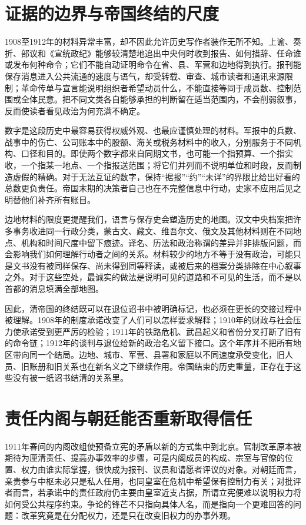 \section{证据的边界与帝国终结的尺度}

1908至1912年的材料异常丰富，却不因此允许历史写作者装作无所不知。上谕、奏折、部议和《宣统政纪》能够较清楚地追出中央何时收到报告、如何措辞、任命谁或发布何种命令；它们不能自动证明命令在省、县、军营和边地得到执行。报刊能保存消息进入公共流通的速度与语气，却受转载、审查、城市读者和通讯来源限制；革命传单与宣言能说明组织者希望动员什么，不能直接等同于成员数、控制范围或全体民意。把不同文类各自能够承担的判断留在适当范围内，不会削弱叙事，反而使读者看见政治为何充满不确定。

数字是这段历史中最容易获得权威外观、也最应谨慎处理的材料。军报中的兵数、战事中的伤亡、公司账本中的股额、海关或税务材料中的收入，分别服务于不同机构、口径和目的。即使两个数字都来自同期文书，也可能一个指预算、一个指实收，一个指某一地点、一个指报送范围；将它们并列而不说明单位和时段，反而制造虚假的精确。对于无法互证的数字，保持“据报”“约”“未详”的界限比给出好看的总数更负责任。帝国末期的决策者自己也在不完整信息中行动，史家不应用后见之明替他们补齐所有账目。

边地材料的限度更提醒我们，语言与保存史会塑造历史的地图。汉文中央档案把许多事务收进同一行政分类，蒙古文、藏文、维吾尔文、俄文及其他材料则在不同地点、机构和时间尺度中留下痕迹。译名、历法和政治称谓的差异并非排版问题，而会影响我们如何理解行动者之间的关系。材料较少的地方不等于没有政治，可能只是文书没有被同样保存、尚未得到同等释读，或被后来的档案分类排除在中心叙事之外。对于这些空处，最诚实的做法是说明可见的道路和不可见的生活，而不是以首都的消息填满全部地图。

因此，清帝国的终结既可以在退位诏书中被明确标记，也必须在更长的交接过程中被理解。1908年的制度承诺改变了人们可以怎样要求解释；1910年的财政与社会压力使承诺受到更严厉的检验；1911年的铁路危机、武昌起义和省份分叉打断了旧有的命令链；1912年的谈判与退位给新的政治名义留下接口。这个年序并不把所有地区带向同一个结局。边地、城市、军营、县署和家庭以不同速度承受变化，旧人员、旧账册和旧关系也在新名义之下继续作用。帝国结束的历史重量，正存在于这些没有被一纸诏书结清的关系里。

\section{责任内阁与朝廷能否重新取得信任}

1911年春间的内阁改组使预备立宪的矛盾以新的方式集中到北京。官制改革原本被期待为厘清责任、提高办事效率的步骤，可是内阁成员的构成、宗室与官僚的位置、权力由谁实际掌握，很快成为报刊、议员和请愿者评议的对象。对朝廷而言，亲贵参与中枢未必只是私人任用，也同皇室在危机中希望保有控制力有关；对批评者而言，若承诺中的责任政府仍主要由皇室近支占据，所谓立宪便难以说明权力将如何受公共程序约束。争论的锋芒不只指向具体人名，而是指向一个更难回答的问题：改革究竟是在分配权力，还是只在改变旧权力的办事外观。

